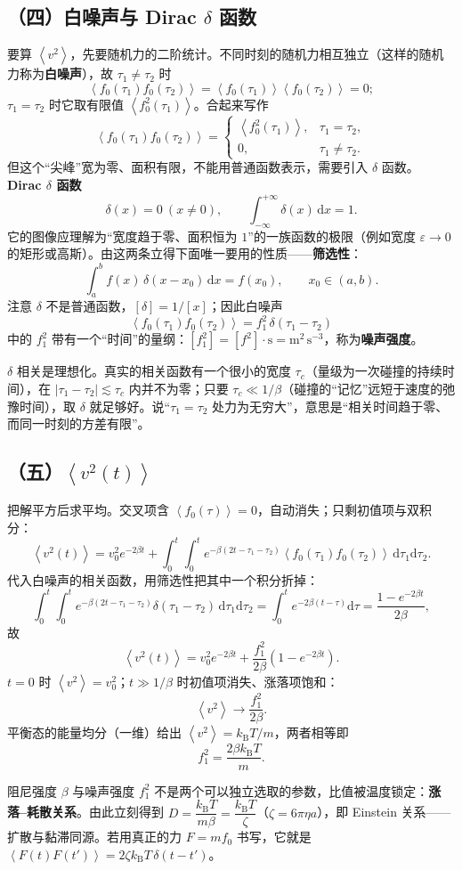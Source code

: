 \documentclass[11pt,a4paper,openany]{ctexbook}
\newcommand{\dd}{\mathrm d}
\newcommand{\avg}[1]{\left\langle #1\right\rangle}
\newcommand{\kBT}{k_{\mathrm B}T}
\begin{document}
\subsection*{（四）白噪声与 Dirac $\delta$ 函数}
要算 $\avg{v^2}$，先要随机力的二阶统计。不同时刻的随机力相互独立（这样的随机力称为\textbf{白噪声}），故 $\tau_1\neq\tau_2$ 时
\[
\avg{f_0(\tau_1)f_0(\tau_2)}
=\avg{f_0(\tau_1)}\avg{f_0(\tau_2)}=0 ;
\]
$\tau_1=\tau_2$ 时它取有限值 $\avg{f_0^2(\tau_1)}$。合起来写作
\[
\avg{f_0(\tau_1)f_0(\tau_2)}
=\begin{cases}
\avg{f_0^2(\tau_1)}, & \tau_1=\tau_2,\\[1mm]
0, & \tau_1\neq\tau_2 .
\end{cases}
\]
但这个“尖峰”宽为零、面积有限，不能用普通函数表示，需要引入 $\delta$ 函数。
\textbf{Dirac $\delta$ 函数}
\[
\delta(x)=0\ (x\neq0),
\qquad
\int_{-\infty}^{+\infty}\delta(x)\,\dd x=1 .
\]
它的图像应理解为“宽度趋于零、面积恒为 $1$”的一族函数的极限（例如宽度 $\varepsilon\to0$ 的矩形或高斯）。由这两条立得下面唯一要用的性质——\textbf{筛选性}：
\[
\int_a^b f(x)\,\delta(x-x_0)\,\dd x=f(x_0),
\qquad x_0\in(a,b).
\]
注意 $\delta$ 不是普通函数，$[\delta]=1/[x]$；因此白噪声
\[
\boxed{\avg{f_0(\tau_1)f_0(\tau_2)}=f_1^2\,\delta(\tau_1-\tau_2)}
\]
中的 $f_1^2$ 带有一个“时间”的量纲：$[f_1^2]=[f^2]\cdot\mathrm{s}=\mathrm{m^2\,s^{-3}}$，称为\textbf{噪声强度}。
\begin{notebox}
$\delta$ 相关是理想化。真实的相关函数有一个很小的宽度 $\tau_c$（量级为一次碰撞的持续时间），在 $|\tau_1-\tau_2|\lesssim\tau_c$ 内并不为零；只要 $\tau_c\ll1/\beta$（碰撞的“记忆”远短于速度的弛豫时间），取 $\delta$ 就足够好。说“$\tau_1=\tau_2$ 处力为无穷大”，意思是“相关时间趋于零、而同一时刻的方差有限”。
\end{notebox}
\subsection*{（五）$\avg{v^2(t)}$}
把解平方后求平均。交叉项含 $\avg{f_0(\tau)}=0$，自动消失；只剩初值项与双积分：
\[
\avg{v^2(t)}
=v_0^2e^{-2\beta t}
+\int_{0}^{t}\!\!\int_{0}^{t}
e^{-\beta(2t-\tau_1-\tau_2)}
\avg{f_0(\tau_1)f_0(\tau_2)}\,\dd\tau_1\dd\tau_2 .
\]
代入白噪声的相关函数，用筛选性把其中一个积分折掉：
\[
\int_{0}^{t}\!\!\int_{0}^{t}
e^{-\beta(2t-\tau_1-\tau_2)}\delta(\tau_1-\tau_2)\,\dd\tau_1\dd\tau_2
=\int_{0}^{t}e^{-2\beta(t-\tau)}\dd\tau
=\frac{1-e^{-2\beta t}}{2\beta},
\]
故
\[
\boxed{\avg{v^2(t)}=v_0^2e^{-2\beta t}+\frac{f_1^2}{2\beta}\left(1-e^{-2\beta t}\right)} .
\]
$t=0$ 时 $\avg{v^2}=v_0^2$；$t\gg1/\beta$ 时初值项消失、涨落项饱和：
\[
\avg{v^2}\longrightarrow\frac{f_1^2}{2\beta}.
\]
平衡态的能量均分（一维）给出 $\avg{v^2}=\kBT/m$，两者相等即
\[
\boxed{f_1^2=\frac{2\beta\kBT}{m}} .
\]
\begin{notebox}[title={顺带一提：涨落--耗散}]
阻尼强度 $\beta$ 与噪声强度 $f_1^2$ 不是两个可以独立选取的参数，比值被温度锁定：\textbf{涨落--耗散关系}。由此立刻得到 $D=\dfrac{\kBT}{m\beta}=\dfrac{\kBT}{\zeta}$（$\zeta=6\pi\eta a$），即 Einstein 关系——扩散与黏滞同源。若用真正的力 $F=mf_0$ 书写，它就是 $\avg{F(t)F(t')}=2\zeta\kBT\,\delta(t-t')$。
\end{notebox}
\end{document}
